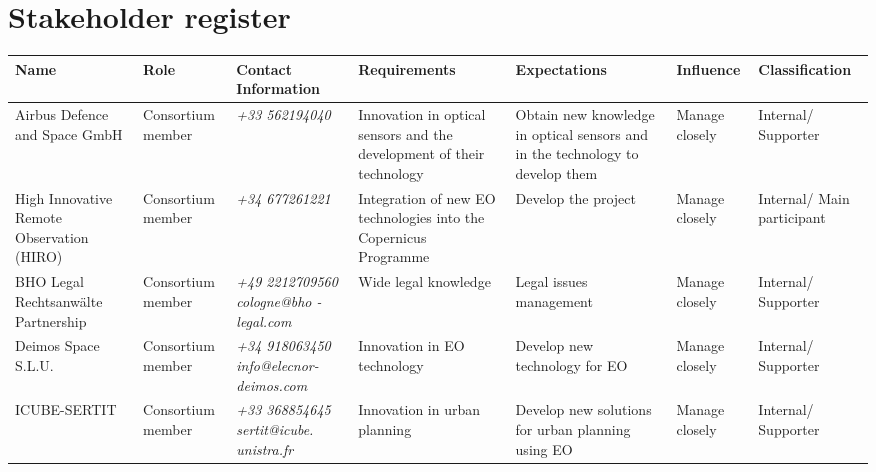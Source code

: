 \section{Stakeholder register}

\begin{center}
	\begin{longtable}{>{\raggedright\arraybackslash}p{2.2cm} >{\raggedright\arraybackslash}p{1.5cm} >{\raggedright\arraybackslash}p{2cm} >{\raggedright\arraybackslash}p{2.2cm} >{\raggedright\arraybackslash}p{2cm} >{\raggedright\arraybackslash}p{1.4cm} >{\raggedright\arraybackslash}p{2.1cm}}
		
		\toprule[2pt]
		
		\textbf{Name} & \textbf{Role} & \textbf{Contact Information} & \textbf{Requirements} & \textbf{Expectations} & \textbf{Influence} & \textbf{Classification} \\ 
		
		\midrule[1.5pt] \endhead
		
		Airbus Defence and Space GmbH & Consortium member & \textit{+33 562194040} & Innovation in optical sensors and the development of their technology & Obtain new knowledge in optical sensors and in the technology to develop them & Manage closely & Internal/ Supporter \\ \hline
		
		High Innovative Remote Observation (HIRO) & Consortium member & \textit{+34 677261221} & Integration of new EO technologies into the Copernicus Programme & Develop the project & Manage closely & Internal/ Main participant \\ \hline
		
		BHO Legal Rechtsanwälte Partnership & Consortium member & \textit{+49 2212709560 \newline \newline cologne@bho -legal.com} & Wide legal knowledge & Legal issues management & Manage closely & Internal/ Supporter \\ \hline
		
		Deimos Space S.L.U. & Consortium member & \textit{+34 918063450 \newline \newline info@elecnor- deimos.com} & Innovation in EO technology & Develop new technology for EO & Manage closely & Internal/ Supporter \\ \hline
		
		ICUBE-SERTIT & Consortium member & \textit{+33 368854645 \newline \newline sertit@icube. unistra.fr} & Innovation in urban planning & Develop new solutions for urban planning using EO & Manage closely & Internal/ Supporter \\ \hline
		

\end{longtable}
\end{center}
